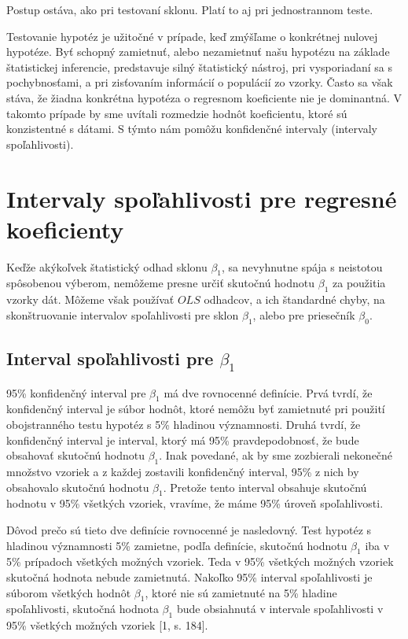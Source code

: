 \documentclass[]{tukediphc}
\begin{document}
Postup ostáva, ako pri testovaní sklonu. Platí to aj pri jednostrannom teste.

Testovanie hypotéz je užitočné v prípade, keď zmýšľame o konkrétnej nulovej hypotéze. Byť schopný zamietnuť, alebo nezamietnuť našu hypotézu na základe štatistickej inferencie, predstavuje silný štatistický nástroj, pri vysporiadaní sa s pochybnosťami, a pri zisťovaním informácií o populácií zo vzorky. Často sa však stáva, že žiadna konkrétna hypotéza o regresnom koeficiente nie je dominantná. V takomto prípade by sme uvítali rozmedzie hodnôt koeficientu, ktoré sú konzistentné s dátami. S týmto nám pomôžu konfidenčné intervaly (intervaly spoľahlivosti). 

\newpage
\section{Intervaly spoľahlivosti pre regresné koeficienty}

Keďže akýkoľvek štatistický odhad sklonu $\beta_{1}$, sa nevyhnutne spája s neistotou spôsobenou výberom, nemôžeme presne určiť skutočnú hodnotu $\beta_{1}$ za použitia vzorky dát. Môžeme však používať $OLS$ odhadcov, a ich štandardné chyby, na skonštruovanie intervalov spoľahlivosti pre sklon $\beta_{1}$, alebo pre priesečník $\beta_{0}$. 

\subsection{Interval spoľahlivosti pre $\beta_{1}$}

95\% konfidenčný interval pre $\beta_{1}$ má dve rovnocenné definície. Prvá tvrdí, že konfidenčný interval je súbor hodnôt, ktoré nemôžu byť zamietnuté pri použití obojstranného testu hypotéz s 5\% hladinou významnosti. Druhá tvrdí, že konfidenčný interval je interval, ktorý má 95\% pravdepodobnosť, že bude obsahovať skutočnú hodnotu $\beta_{1}$. Inak povedané, ak by sme zozbierali nekonečné množstvo vzoriek a z každej zostavili konfidenčný interval, 95\% z nich by obsahovalo skutočnú hodnotu $\beta_{1}$. Pretože tento interval obsahuje skutočnú hodnotu v 95\% všetkých vzoriek, vravíme, že máme 95\% úroveň spoľahlivosti.

Dôvod prečo sú tieto dve definície rovnocenné je nasledovný. Test hypotéz s hladinou významnosti 5\% zamietne, podľa definície, skutočnú hodnotu $\beta_{1}$ iba v 5\% prípadoch všetkých možných vzoriek. Teda v 95\% všetkých možných vzoriek skutočná hodnota nebude zamietnutá. Nakoľko 95\% interval spoľahlivosti je súborom všetkých hodnôt $\beta_{1}$, ktoré nie sú zamietnuté na 5\% hladine spoľahlivosti, skutočná hodnota $\beta_{1}$ bude obsiahnutá v intervale spoľahlivosti v 95\% všetkých možných vzoriek [1, s. 184].
\end{document}
